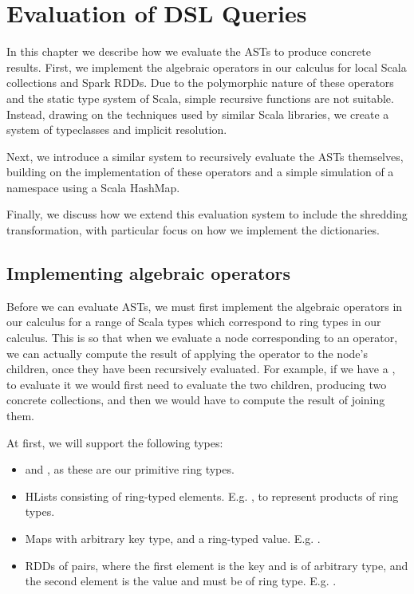 \chapter{Evaluation of DSL Queries} \label{evaluation}

In this chapter we describe how we evaluate the ASTs to produce concrete results. First, we implement the algebraic operators in our calculus for local Scala collections and Spark RDDs. Due to the polymorphic nature of these operators and the static type system of Scala, simple recursive functions are not suitable. Instead, drawing on the techniques used by similar Scala libraries, we create a system of typeclasses and implicit resolution.

Next, we introduce a similar system to recursively evaluate the ASTs themselves, building on the implementation of these operators and a simple simulation of a namespace using a Scala HashMap. 

Finally, we discuss how we extend this evaluation system to include the shredding transformation, with particular focus on how we implement the dictionaries.

\section{Implementing algebraic operators}

Before we can evaluate ASTs, we must first implement the algebraic operators in our calculus for a range of Scala types which correspond to ring types in our calculus. This is so that when we evaluate a node corresponding to an operator, we can actually compute the result of applying the operator to the node's children, once they have been recursively evaluated. For example, if we have a , to evaluate it we would first need to evaluate the two children, producing two concrete collections, and then we would have to compute the result of joining them.

At first, we will support the following types:
\begin{itemize}
\item{ and , as these are our primitive ring types.}
\item{HLists consisting of ring-typed elements. E.g. , to represent products of ring types.} 
\item{Maps with arbitrary key type, and a ring-typed value.
E.g. .}
\item{RDDs of pairs, where the first element is the key and is of arbitrary type, and the second element is the value and must be of ring type. E.g. \lin{RDD[(String,Int::Boolean::HNil)}.}
\end{itemize}


